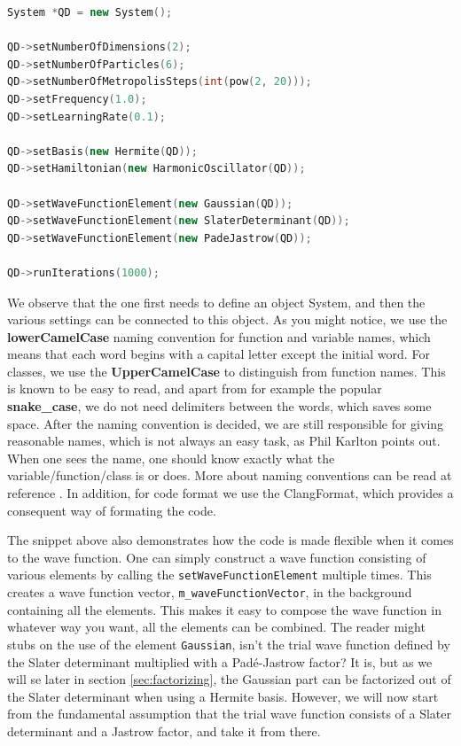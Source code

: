 \begin{lstlisting}[language={C++}]
System *QD = new System();

QD->setNumberOfDimensions(2);
QD->setNumberOfParticles(6);
QD->setNumberOfMetropolisSteps(int(pow(2, 20)));
QD->setFrequency(1.0);
QD->setLearningRate(0.1);

QD->setBasis(new Hermite(QD));
QD->setHamiltonian(new HarmonicOscillator(QD));

QD->setWaveFunctionElement(new Gaussian(QD));
QD->setWaveFunctionElement(new SlaterDeterminant(QD));
QD->setWaveFunctionElement(new PadeJastrow(QD));

QD->runIterations(1000);
\end{lstlisting}
We observe that the one first needs to define an object System, and then the various settings can be connected to this object. As you might notice, we use the \textbf{lowerCamelCase} naming convention for function and variable names, which means that each word begins with a capital letter except the initial word. For classes, we use the \textbf{UpperCamelCase} to distinguish from function names. This is known to be easy to read, and apart from for example the popular \textbf{snake\_case}, we do not need delimiters between the words, which saves some space. After the naming convention is decided, we are still responsible for giving reasonable names, which is not always an easy task, as Phil Karlton points out. When one sees the name, one should know exactly what the variable/function/class is or does. More about naming conventions can be read at reference \cite{noauthor_naming_2019}. In addition, for code format we use the ClangFormat, which provides a consequent way of formating the code. 

The snippet above also demonstrates how the code is made flexible when it comes to the wave function. One can simply construct a wave function consisting of various elements by calling the \lstinline{setWaveFunctionElement} multiple times. This creates a wave function vector, \lstinline{m_waveFunctionVector}, in the background containing all the elements. This makes it easy to compose the wave function in whatever way you want, all the elements can be combined. The reader might stubs on the use of the element \lstinline{Gaussian}, isn't the trial wave function defined by the Slater determinant multiplied with a Padé-Jastrow factor? It is, but as we will se later in section \ref{sec:factorizing}, the Gaussian part can be factorized out of the Slater determinant when using a Hermite basis. However, we will now start from the fundamental assumption that the trial wave function consists of a Slater determinant and a Jastrow factor, and take it from there. 

